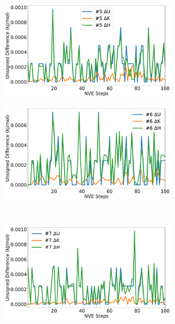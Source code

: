 \begin{figure}[htbp]
\begin{subfigure}{0.48\textwidth}
\end{subfigure}
\\
\begin{subfigure}{0.48\textwidth}
\includegraphics[width=\linewidth]{figs/div5.pdf}
\end{subfigure}
\begin{subfigure}{0.48\textwidth}
\includegraphics[width=\linewidth]{figs/div6.pdf}
\end{subfigure}
\\
\begin{subfigure}{0.48\textwidth}
\includegraphics[width=\linewidth]{figs/div7.pdf}

\end{subfigure}
\end{figure}
